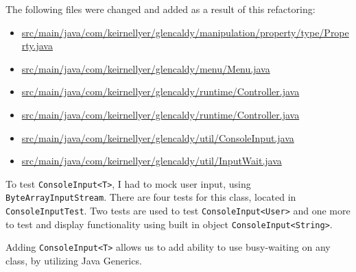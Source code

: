 \documentclass{article}
\newcommand{\code}[1]{\texttt{#1}}
\begin{document}
The following files were changed and added as a result of this refactoring:
\begin{itemize}
  \item \href{https://github.com/awave1/assessment-loan-system/commit/bd538f05a6fbff8283b397c9a265040ab082542d#diff-1c55a45f266eb74be0a94a96e52a6c2a}{src/main/java/com/keirnellyer/glencaldy/manipulation/property/type/Property.java}
  \item \href{https://github.com/awave1/assessment-loan-system/commit/bd538f05a6fbff8283b397c9a265040ab082542d#diff-d9f6cc6de5b899354d46d7795b29022c}{src/main/java/com/keirnellyer/glencaldy/menu/Menu.java}
  \item \href{https://github.com/awave1/assessment-loan-system/commit/bd538f05a6fbff8283b397c9a265040ab082542d#diff-0f417f930dba04b27baaa509b7b80bbf}{src/main/java/com/keirnellyer/glencaldy/runtime/Controller.java}
  \item \href{https://github.com/awave1/assessment-loan-system/commit/bd538f05a6fbff8283b397c9a265040ab082542d#diff-a28d2a28f9e29d7231bd79421f225da1}{src/main/java/com/keirnellyer/glencaldy/runtime/Controller.java}
  \item \href{https://github.com/awave1/assessment-loan-system/commit/bd538f05a6fbff8283b397c9a265040ab082542d#diff-a28d2a28f9e29d7231bd79421f225da1}{src/main/java/com/keirnellyer/glencaldy/util/ConsoleInput.java}
  \item \href{https://github.com/awave1/assessment-loan-system/commit/bd538f05a6fbff8283b397c9a265040ab082542d#diff-c2879e1c4aeb580d558cae1973565454}{src/main/java/com/keirnellyer/glencaldy/util/InputWait.java}
\end{itemize}

To test \code{ConsoleInput<T>}, I had to mock user input, using \code{ByteArrayInputStream}. There are four tests for this class, located in \code{ConsoleInputTest}. Two tests are used to test \code{ConsoleInput<User>} and one more to test and display functionality using built in object \code{ConsoleInput<String>}.

Adding \code{ConsoleInput<T>} allows us to add ability to use busy-waiting on any class, by utilizing Java Generics.
\end{document}
